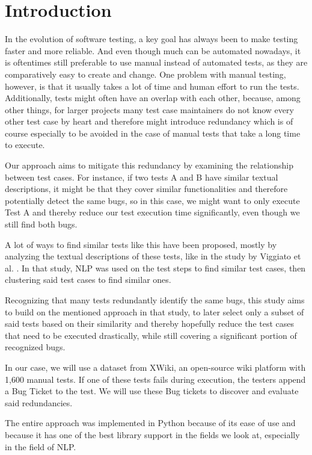 \section{Introduction}

In the evolution of software testing, a key goal has always been to make testing faster and more reliable. And even though much can be automated nowadays, it is oftentimes still preferable to use manual instead of automated tests, as they are comparatively easy to create and change. One problem with manual testing, however, is that it usually takes a lot of time and human effort to run the tests. Additionally, tests might often have an overlap with each other, because, among other things, for larger projects many test case maintainers do not know every other test case by heart and therefore might introduce redundancy which is of course especially to be avoided in the case of manual tests that take a long time to execute.

Our approach aims to mitigate this redundancy by examining the relationship between test cases. For instance, if two tests A and B have similar textual descriptions, it might be that they cover similar functionalities and therefore potentially detect the same bugs, so in this case, we might want to only execute Test A and thereby reduce our test execution time significantly, even though we still find both bugs. 

A lot of ways to find similar tests like this have been proposed, mostly by analyzing the textual descriptions of these tests, like in the study by Viggiato et al. \cite{Viggiato}. In that study, \ac{NLP} was used on the test steps to find similar test cases, then clustering said test cases to find similar ones.

Recognizing that many tests redundantly identify the same bugs, this study aims to build on the mentioned approach in that study, to later select only a subset of said tests based on their similarity and thereby hopefully reduce the test cases that need to be executed drastically, while still covering a significant portion of recognized bugs.

In our case, we will use a dataset from XWiki, an open-source wiki platform with 1,600 manual tests. If one of these tests fails during execution, the testers append a Bug Ticket to the test. We will use these Bug tickets to discover and evaluate said redundancies.

The entire approach was implemented in Python because of its ease of use and because it has one of the best library support in the fields we look at, especially in the field of \ac{NLP}.